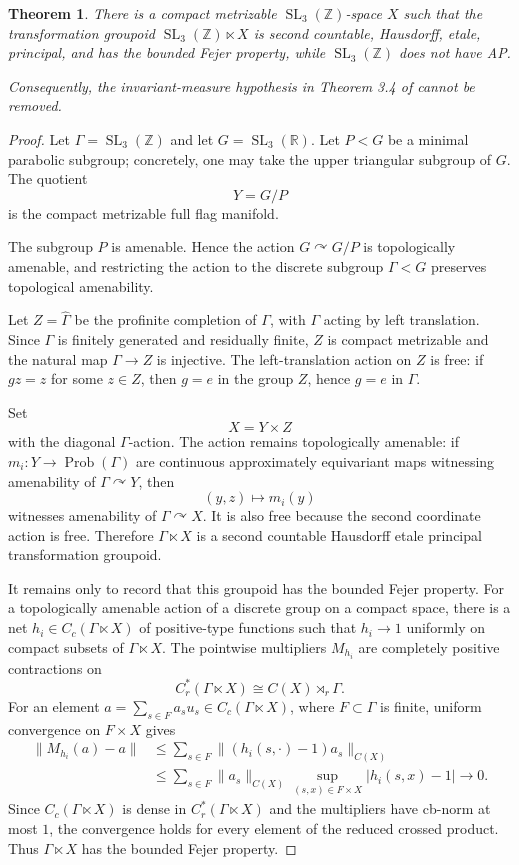 \documentclass[11pt]{article}
\newtheorem{theorem}{Theorem}
\newcommand{\R}{\mathbb R}
\newcommand{\Z}{\mathbb Z}
\newcommand{\GammaSL}{\operatorname{SL}_3(\Z)}
\newcommand{\GSL}{\operatorname{SL}_3(\R)}
\newcommand{\Prob}{\operatorname{Prob}}
\begin{document}
\begin{theorem}
There is a compact metrizable \(\GammaSL\)-space \(X\) such that the
transformation groupoid \(\GammaSL\ltimes X\) is second countable, Hausdorff,
etale, principal, and has the bounded Fejer property, while \(\GammaSL\) does
not have AP.

Consequently, the invariant-measure hypothesis in Theorem 3.4 of
\cite{AAK2025} cannot be removed.
\end{theorem}

\begin{proof}
Let \(\Gamma=\GammaSL\) and let \(G=\GSL\).  Let \(P<G\) be a minimal parabolic
subgroup; concretely, one may take the upper triangular subgroup of \(G\).
The quotient
\[
   Y=G/P
\]
is the compact metrizable full flag manifold.

The subgroup \(P\) is amenable.  Hence the action \(G\curvearrowright G/P\) is
topologically amenable, and restricting the action to the discrete subgroup
\(\Gamma<G\) preserves topological amenability.

Let \(Z=\widehat{\Gamma}\) be the profinite completion of \(\Gamma\), with
\(\Gamma\) acting by left translation.  Since \(\Gamma\) is finitely generated
and residually finite, \(Z\) is compact metrizable and the natural map
\(\Gamma\to Z\) is injective.  The left-translation action on \(Z\) is free:
if \(g z=z\) for some \(z\in Z\), then \(g=e\) in the group \(Z\), hence
\(g=e\) in \(\Gamma\).

Set
\[
   X=Y\times Z
\]
with the diagonal \(\Gamma\)-action.  The action remains topologically amenable:
if \(m_i:Y\to\Prob(\Gamma)\) are continuous approximately equivariant maps
witnessing amenability of \(\Gamma\curvearrowright Y\), then
\[
   (y,z)\longmapsto m_i(y)
\]
witnesses amenability of \(\Gamma\curvearrowright X\).  It is also free because
the second coordinate action is free.  Therefore \(\Gamma\ltimes X\) is a
second countable Hausdorff etale principal transformation groupoid.

It remains only to record that this groupoid has the bounded Fejer property.
For a topologically amenable action of a discrete group on a compact space,
there is a net \(h_i\in C_c(\Gamma\ltimes X)\) of positive-type functions such
that \(h_i\to 1\) uniformly on compact subsets of \(\Gamma\ltimes X\).  The
pointwise multipliers \(M_{h_i}\) are completely positive contractions on
\[
   C_r^*(\Gamma\ltimes X)\cong C(X)\rtimes_r\Gamma.
\]
For an element \(a=\sum_{s\in F} a_s u_s\in C_c(\Gamma\ltimes X)\), where
\(F\subset\Gamma\) is finite, uniform convergence on \(F\times X\) gives
\[
\begin{aligned}
\|M_{h_i}(a)-a\|
&\leq \sum_{s\in F}\|(h_i(s,\cdot)-1)a_s\|_{C(X)}  \\
&\leq \sum_{s\in F}\|a_s\|_{C(X)}
   \sup_{(s,x)\in F\times X}|h_i(s,x)-1|
   \longrightarrow 0.
\end{aligned}
\]
Since \(C_c(\Gamma\ltimes X)\) is dense in \(C_r^*(\Gamma\ltimes X)\) and the
multipliers have cb-norm at most \(1\), the convergence holds for every element
of the reduced crossed product.  Thus \(\Gamma\ltimes X\) has the bounded Fejer
property.


\end{proof}
\end{document}
